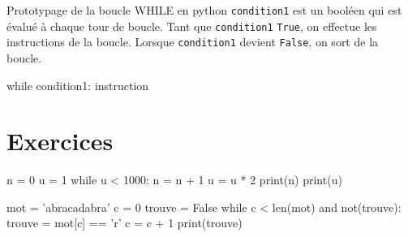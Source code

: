 		\begin{easybox}{Prototypage de la boucle WHILE en python}
	\verb|condition1| est un booléen qui est évalué à chaque tour de boucle.  Tant que \verb|condition1| \verb|True|, on effectue les instructions de la boucle. Lorsque \verb|condition1| devient \verb|False|, on sort de la boucle.

	\begin{center}
	
	\begin{CodePythontexAlt}[TaillePolice=\normalsize, Largeur=1\linewidth,Centre,PremLigne=1, Lignes=false,]{}
		while condition1:
			instruction
	\end{CodePythontexAlt}
	\end{center}
	

			\end{easybox}

			\section{Exercices}

	\begin{exercice_cours}{}
		\begin{minipage}{0.48\linewidth}
			\begin{CodePythontexAlt}[TaillePolice=\normalsize, Largeur=1\linewidth,Centre,PremLigne=1]{}
			n = 0
			u = 1
			while u < 1000:
				n = n + 1
				u = u * 2
			print(n)
			print(u)
		\end{CodePythontexAlt}
				
		\end{minipage}\hfill
		\begin{minipage}{0.48\linewidth}
			\begin{CodePythontexAlt}[TaillePolice=\normalsize, Largeur=1\linewidth,Centre,PremLigne=1]{}
			mot = 'abracadabra'
			c = 0
			trouve = False
			while c < len(mot) and not(trouve):
				trouve = mot[c] == 'r'
				c = c + 1
			print(trouve)
			\end{CodePythontexAlt}
		\end{minipage}\hfill
		 
	\end{exercice_cours}
	
